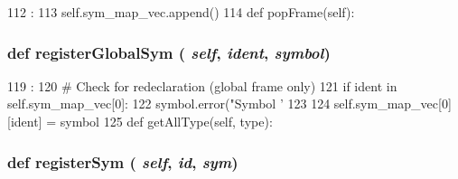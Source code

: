 \begin{DoxyCode}
112                        :
113         self.sym_map_vec.append({})
114 
    def popFrame(self):
\end{DoxyCode}
\hypertarget{classslicc_1_1symbols_1_1SymbolTable_1_1SymbolTable_a7a7ed8c9108ff97ac8aa23711672544d}{
\subsubsection[{registerGlobalSym}]{\setlength{\rightskip}{0pt plus 5cm}def registerGlobalSym ( {\em self}, \/   {\em ident}, \/   {\em symbol})}}
\label{classslicc_1_1symbols_1_1SymbolTable_1_1SymbolTable_a7a7ed8c9108ff97ac8aa23711672544d}



\begin{DoxyCode}
119                                               :
120         # Check for redeclaration (global frame only)
121         if ident in self.sym_map_vec[0]:
122             symbol.error("Symbol '%
123 
124         self.sym_map_vec[0][ident] = symbol
125 
    def getAllType(self, type):
\end{DoxyCode}
\hypertarget{classslicc_1_1symbols_1_1SymbolTable_1_1SymbolTable_af211eebadbc4507ebf53588ae11675c7}{
\subsubsection[{registerSym}]{\setlength{\rightskip}{0pt plus 5cm}def registerSym ( {\em self}, \/   {\em id}, \/   {\em sym})}}
\label{classslicc_1_1symbols_1_1SymbolTable_1_1SymbolTable_af211eebadbc4507ebf53588ae11675c7}



